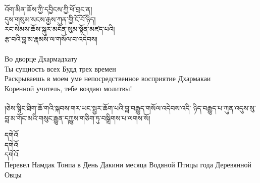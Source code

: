 




{\ti
འོག་མིན་ཆོས་ཀྱི་དབྱིངས་ཀྱི་ཕོ་བྲང་ན། \\
དུས་གསུམ་སངས་རྒྱས་ཀུན་གྱི་ངོ་བོ་ཉིད། \\
རང་སེམས་ཆོས་སྐུར་མངོན་སུམ་སྟོན་མཛད་པའི། \\
རྩ་བའི་བླ་མ་རྣམས་ལ་གསོལ་བ་འདེབས།}\\
\\
\ru
Во дворце Дхармадхату\\
Ты сущность всех Будд трех времен\\
Раскрываешь в моем уме непосредственное восприятие Дхармакаи \\
Коренной учитель, тебе воздаю молитвы!\\
\\


{\ti །ཅེས་སྙིང་ཐིག་ཆོ་གའི་སྐབས་གར་ཡང་སྦྱར་ཆོག་པའི་བླ་བརྒྱུད་གསོལ་འདེབས་འདི་
ཉིད་བརྒྱུད་པ་ཀུན་འདུས་སུ་བླ་མ་གོང་མའི་གསུང་རྒྱུན་དཀྱུས་གཅིག་ཏུ་བསྒྲིགས་པ་ལགས་སོ།}

{\ti
དགེའོ\\
དགེའོ\\
དགེའོ}\\

\scriptsize Перевел Намдак Тонпа в День Дакини месяца Водяной Птицы года Деревянной Овцы\normalsize


